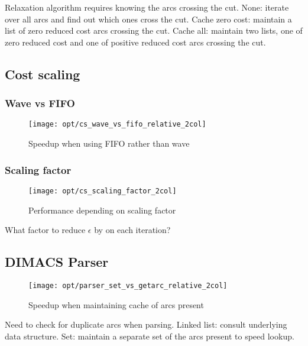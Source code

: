 Relaxation algorithm requires knowing the arcs crossing the cut. None: iterate over all arcs and find out which ones cross the cut. Cache zero cost: maintain a list of zero reduced cost arcs crossing the cut. Cache all: maintain two lists, one of zero reduced cost and one of positive reduced cost arcs crossing the cut.

\subsection{Cost scaling}

\subsubsection{Wave vs FIFO}

\begin{figure}
    \centering
    \texttt{[image: opt/cs\_wave\_vs\_fifo\_relative\_2col]}
    \caption{Speedup when using FIFO rather than wave}
    \label{fig:opt-cs-wave-vs-fifo}
\end{figure}


\subsubsection{Scaling factor}

\begin{figure}
    \centering
    \texttt{[image: opt/cs\_scaling\_factor\_2col]}
    \caption{Performance depending on scaling factor}
    \label{fig:opt-cs-scaling-factor}
\end{figure}

What factor to reduce $\epsilon$ by on each iteration?

\subsection{DIMACS Parser}

\begin{figure}
    \centering
    \texttt{[image: opt/parser\_set\_vs\_getarc\_relative\_2col]}
    \caption{Speedup when maintaining cache of arcs present}
    \label{fig:opt-dimacs-parser}
\end{figure}

Need to check for duplicate arcs when parsing. Linked list: consult underlying data structure. Set: maintain a separate set of the arcs present to speed lookup.

